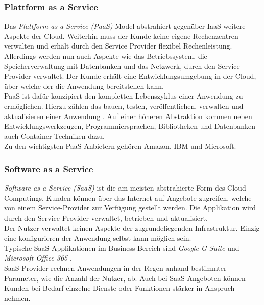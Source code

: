 \subsubsection{Plattform as a Service}
Das \textit{Plattform as a Service (PaaS)}\cite{mell_nist_2011} Model abstrahiert gegenüber IaaS weitere Aspekte der Cloud. Weiterhin muss der Kunde keine eigene Rechenzentren verwalten und erhält durch den Service Provider flexibel Rechenleistung.\\
Allerdings werden nun auch Aspekte wie das Betriebssystem, die Speicherverwaltung mit Datenbanken und das Netzwerk, durch den Service Provider verwaltet. Der Kunde erhält eine Entwicklungsumgebung in der Cloud, über welche der die Anwendung bereitstellen kann. \\
PaaS ist dafür konzipiert den kompletten Lebenszyklus einer Anwendung zu ermöglichen. Hierzu zählen das bauen, testen, veröffentlichen, verwalten und aktualisieren einer Anwendung \cite{dimpi_rani_rajiv_kumar_ranjan_comparative_2014}. Auf einer höheren Abstraktion kommen neben Entwicklungswerkzeugen, Programmiersprachen, Bibliotheken und Datenbanken auch Container-Techniken dazu.\\
Zu den wichtigsten PaaS Anbietern gehören Amazon, IBM und Microsoft. \cite{simon_lohmann_platform_nodate}\cite{sowmya_layers_2014} \cite{mell_nist_2011} 
\subsubsection{Software as a Service}
\textit{Software as a Service (SaaS)} ist die am meisten abstrahierte Form des Cloud-Computings. Kunden können über das Internet auf Angebote zugreifen, welche von einem Service-Provider zur Verfügung gestellt werden. Die Applikation wird durch den Service-Provider verwaltet, betrieben und aktualisiert. \\
Der Nutzer verwaltet keinen Aspekte der zugrundeliegenden Infrastruktur. Einzig eine konfigurieren der Anwendung selbst kann möglich sein.\\
Typische SaaS-Applikationen im Business Bereich sind \textit{Google G Suite} \cite{noauthor_google_nodate}  und \textit{Microsoft Office 365} \cite{noauthor_office_nodate}. \\
SaaS-Provider rechnen Anwendungen in der Regen anhand bestimmter Parameter, wie die Anzahl der Nutzer, ab. Auch bei SaaS-Angeboten können Kunden bei Bedarf einzelne Dienste oder Funktionen stärker in Anspruch nehmen. \cite{wolfgang_herrmann_saas_nodate} \cite{sowmya_layers_2014} \cite{mell_nist_2011}


